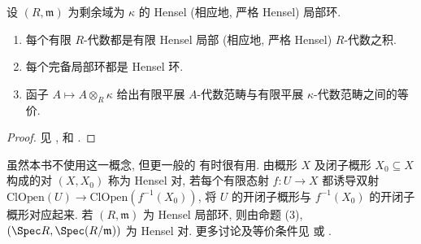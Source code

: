 \newpage
\begin{proposition}\label{src:B.5.10}
设 $(R,\mathfrak m)$ 为剩余域为 $\kappa$ 的 Hensel (相应地, 严格 Hensel) 局部环.
\begin{enumerate}[(1)]
\item 每个有限 $R$-代数都是有限 Hensel 局部 (相应地, 严格 Hensel) $R$-代数之积.
\item 每个完备局部环都是 Hensel 环.
\item 函子 $A\mapsto A\otimes_R\kappa$ 给出有限平展 $A$-代数范畴与有限平展 $\kappa$-代数范畴之间的等价.
\end{enumerate}
\end{proposition}
\begin{proof}
见 \cite[$\mathrm{IV}.18.5.10$--$18.5.15$]{EGA}, \cite[$4.3$--$4.5$]{Mil80} 和 \cite[Tag 04GE]{SP}.
\end{proof}
\begin{remark}\label{src:B.5.11}
虽然本书不使用这一概念, 但更一般的  有时很有用. 由概形 $X$ 及闭子概形 $X_0\subseteq X$ 构成的对 $(X,X_0)$ 称为 Hensel 对, 若每个有限态射 $f:U\to X$ 都诱导双射 $\mathrm{ClOpen}(U)\to\mathrm{ClOpen}(f^{-1}(X_0))$, 将 $U$ 的开闭子概形与 $f^{-1}(X_0)$ 的开闭子概形对应起来. 若 $(R,\mathfrak m)$ 为 Hensel 局部环, 则由命题 (3), $(\Spec R,\Spec(R/\mathfrak m))$ 为 Hensel 对. 更多讨论及等价条件见 \cite[$\mathrm{IV}.18.5.5$]{EGA} 或 \cite[Tag 09XD]{SP}.
\end{remark}

